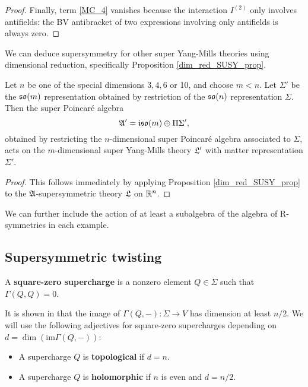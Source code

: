\documentclass[10pt, oneside]{article}
\begin{document}
\begin{proof}
Finally, term \ref{MC_4} vanishes because the interaction $I^{(2)}$ only involves antifields: the BV antibracket of two expressions involving only antifields is always zero.
\end{proof}

We can deduce supersymmetry for other super Yang-Mills theories using dimensional reduction, specifically Proposition \ref{dim_red_SUSY_prop}.
\begin{corollary}
Let $n$ be one of the special dimensions $3,4,6$ or 10, and choose $m < n$.  Let $\Sigma'$ be the $\mathfrak{so}(m)$ representation obtained by restriction of the $\mathfrak{so}(n)$ representation $\Sigma$.  Then the super Poincar\'e algebra
\[\mathfrak{A}' = \mathfrak{iso}(m) \oplus \Pi \Sigma',\]
obtained by restricting the $n$-dimensional super Poincar\'e algebra associated to $\Sigma$, acts on the $m$-dimensional super Yang-Mills theory $\mathfrak{L}'$ with matter representation $\Sigma'$.
\end{corollary}

\begin{proof}
This follows immediately by applying Proposition \ref{dim_red_SUSY_prop} to the $\mathfrak{A}$-supersymmetric theory $\mathfrak{L}$ on $\mathbb R^n$.
\end{proof}

\begin{remark}
We can further include the action of at least a subalgebra of the algebra of R-symmetries in each example. 
\end{remark}

\subsection{Supersymmetric twisting}

\begin{dfn}
A {\bf square-zero supercharge} is a nonzero element $Q\in\Sigma$ such that $\Gamma(Q, Q)=0$.
\end{dfn}

It is shown in \cite[Proposition 3.25]{ElliottSafronov} that the image of $\Gamma(Q, -)\colon \Sigma\rightarrow V$ has dimension at least $n/2$. We will use the following adjectives for square-zero supercharges depending on $d=\dim(\mathrm{im}\Gamma(Q, -))$:
\begin{itemize}
\item A supercharge $Q$ is {\bf topological} if $d = n$.

\item A supercharge $Q$ is {\bf holomorphic} if $n$ is even and $d=n/2$.
\end{itemize}
\end{document}
